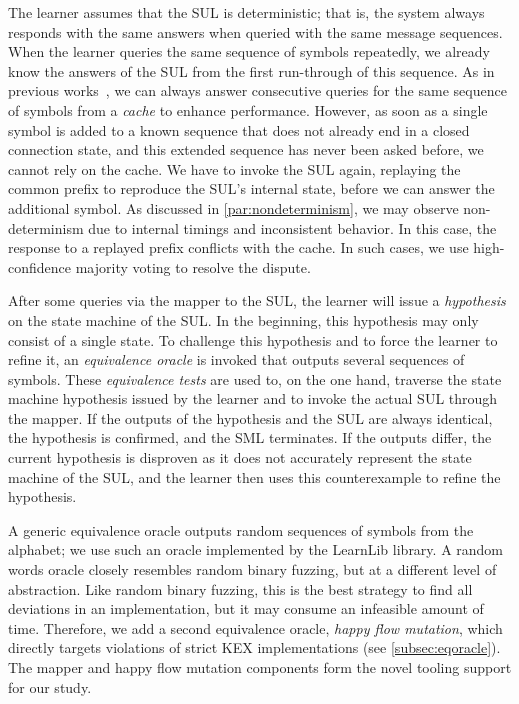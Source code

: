 The learner assumes that the SUL is deterministic; that is, the system always responds with the same answers when queried with the same message sequences. When the learner queries the same sequence of symbols repeatedly, we already know the answers of the SUL from the first run-through of this sequence. As in previous works~\cite{SP:SAPKJ17,CCS:ASJKK16,SP:KIHB23}, we can always answer consecutive queries for the same sequence of symbols from a \emph{cache} to enhance performance. However, as soon as a single symbol is added to a known sequence that does not already end in a closed connection state, and this extended sequence has never been asked before, we cannot rely on the cache. We have to invoke the SUL again, replaying the common prefix to reproduce the SUL's internal state, before we can answer the additional symbol. As discussed in \autoref{par:nondeterminism}, we may observe non-determinism due to internal timings and inconsistent behavior. In this case, the response to a replayed prefix conflicts with the cache. In such cases, we use high-confidence majority voting to resolve the dispute.

After some queries via the mapper to the SUL, the learner will issue a \emph{hypothesis} on the state machine of the SUL. In the beginning, this hypothesis may only consist of a single state. To challenge this hypothesis and to force the learner to refine it, an \emph{equivalence oracle} is invoked that outputs several sequences of symbols. These \emph{equivalence tests} are used to, on the one hand, traverse the state machine hypothesis issued by the learner and to invoke the actual SUL through the mapper. If the outputs of the hypothesis and the SUL are always identical, the hypothesis is confirmed, and the SML terminates. If the outputs differ, the current hypothesis is disproven as it does not accurately represent the state machine of the SUL, and the learner then uses this counterexample to refine the hypothesis.

A generic equivalence oracle outputs random sequences of symbols from the alphabet; we use such an oracle implemented by the LearnLib library. A random words oracle closely resembles random binary fuzzing, but at a different level of abstraction. Like random binary fuzzing, this is the best strategy to find all deviations in an implementation, but it may consume an infeasible amount of time. Therefore, we add a second equivalence oracle, \emph{happy flow mutation}, which directly targets violations of strict KEX implementations (see \autoref{subsec:eqoracle}). The mapper and happy flow mutation components form the novel tooling support for our study.

